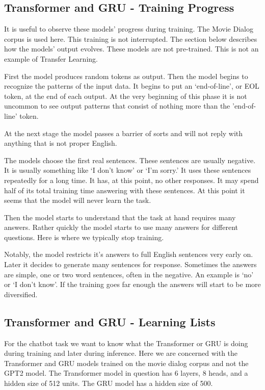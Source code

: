 \subsection{Transformer and GRU - Training Progress}

It is useful to observe these models' progress during training. The Movie Dialog corpus is used here. This training is not interrupted. The section below describes how the models' output evolves. These models are not pre-trained. This is not an example of Transfer Learning.

First the model produces random tokens as output. Then the model begins to recognize the patterns of the input data. It begins to put an `end-of-line', or \ac{EOL} token, at the end of each output. At the very beginning of this phase it is not uncommon to see output patterns that consist of nothing more than the 'end-of-line' token. 

At the next stage the model passes a barrier of sorts and will not reply with anything that is not proper English. 

The models choose the first real sentences. These sentences are usually negative. It is usually something like `I don't know' or `I'm sorry.' It uses these sentences repeatedly for a long time. It has, at this point, no other responses. It may spend half of its total training time answering with these sentences. At this point it seems that the model will never learn the task.

Then the model starts to understand that the task at hand requires many answers. Rather quickly the model starts to use many answers for different questions. Here is where we typically stop training.

Notably, the model restricts it's answers to full English sentences very early on. Later it decides to generate many sentences for response. Sometimes the answers are simple, one or two word sentences, often in the negative. An example is `no' or `I don't know'. If the training goes far enough the answers will start to be more diversified. 


\subsection{Transformer and GRU - Learning Lists}

For the chatbot task we want to know what the Transformer or GRU is doing during training and later during inference. Here we are concerned with the Transformer and GRU models trained on the movie dialog corpus and not the GPT2 model. The Transformer model in question has 6 layers, 8 heads, and a hidden size of 512 units. The GRU model has a hidden size of 500.

